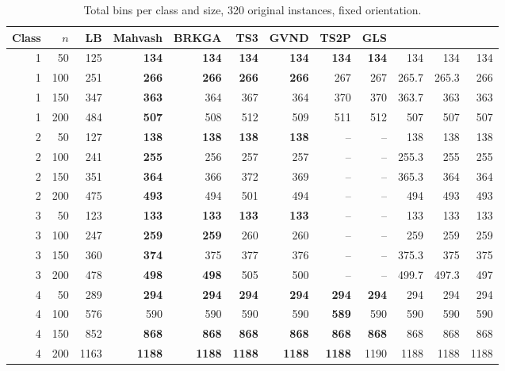 \begin{table}[htbp]
\centering
\footnotesize\setlength{\tabcolsep}{3pt}
\caption{Total bins per class and size, 320 original instances, fixed orientation.}
\label{tab:e-cells}
\begin{tabular}{@{}rrrrrrrrrrrr@{}}
\toprule
Class & $n$ & LB & Mahvash & BRKGA & TS3 & GVND & TS2P & GLS & \cfgfast{} & \cfgbal{} & \cfgqual{}\\
\midrule
1 & 50 & 125 & \textbf{134} & \textbf{134} & \textbf{134} & \textbf{134} & \textbf{134} & \textbf{134} & 134 & 134 & 134 \\
1 & 100 & 251 & \textbf{266} & \textbf{266} & \textbf{266} & \textbf{266} & 267 & 267 & 265.7 & 265.3 & 266 \\
1 & 150 & 347 & \textbf{363} & 364 & 367 & 364 & 370 & 370 & 363.7 & 363 & 363 \\
1 & 200 & 484 & \textbf{507} & 508 & 512 & 509 & 511 & 512 & 507 & 507 & 507 \\
2 & 50 & 127 & \textbf{138} & \textbf{138} & \textbf{138} & \textbf{138} & -- & -- & 138 & 138 & 138 \\
2 & 100 & 241 & \textbf{255} & 256 & 257 & 257 & -- & -- & 255.3 & 255 & 255 \\
2 & 150 & 351 & \textbf{364} & 366 & 372 & 369 & -- & -- & 365.3 & 364 & 364 \\
2 & 200 & 475 & \textbf{493} & 494 & 501 & 494 & -- & -- & 494 & 493 & 493 \\
3 & 50 & 123 & \textbf{133} & \textbf{133} & \textbf{133} & \textbf{133} & -- & -- & 133 & 133 & 133 \\
3 & 100 & 247 & \textbf{259} & \textbf{259} & 260 & 260 & -- & -- & 259 & 259 & 259 \\
3 & 150 & 360 & \textbf{374} & 375 & 377 & 376 & -- & -- & 375.3 & 375 & 375 \\
3 & 200 & 478 & \textbf{498} & \textbf{498} & 505 & 500 & -- & -- & 499.7 & 497.3 & 497 \\
4 & 50 & 289 & \textbf{294} & \textbf{294} & \textbf{294} & \textbf{294} & \textbf{294} & \textbf{294} & 294 & 294 & 294 \\
4 & 100 & 576 & 590 & 590 & 590 & 590 & \textbf{589} & 590 & 590 & 590 & 590 \\
4 & 150 & 852 & \textbf{868} & \textbf{868} & \textbf{868} & \textbf{868} & \textbf{868} & \textbf{868} & 868 & 868 & 868 \\
4 & 200 & 1163 & \textbf{1188} & \textbf{1188} & \textbf{1188} & \textbf{1188} & \textbf{1188} & 1190 & 1188 & 1188 & 1188 \\

\end{tabular}
\end{table}

